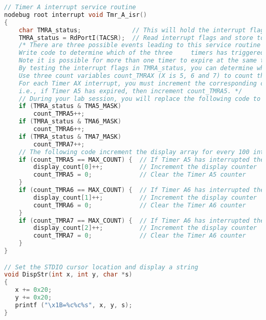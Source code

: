\begin{lstlisting}[frame=single,language=C]
// Timer A interrupt service routine
nodebug root interrupt void Tmr_A_isr()
{
    char TMRA_status;              // This will hold the interrupt flags
    TMRA_status = RdPortI(TACSR);  // Read interrupt flags and store to TMRA_status
    /* There are three possible events leading to this service routine being called
    Write code to determine which of the three     timers has triggered the interrupt.
    Note it is possible for more than one timer to expire at the same time, thus your code must service all triggers.
    By testing the interrupt flags in TMRA_status, you can determine which counters have expired.
    Use three count variables count_TMRAX (X is 5, 6 and 7) to count the number of interrupts.
    For each Timer AX interrupt, you must increment the corresponding count variable.
    i.e., if Timer A5 has expired, then increment count_TMRA5. */
    // During your lab session, you will replace the following code to perform as specified above
    if (TMRA_status & TMA5_MASK)
    	count_TMRA5++;
    if (TMRA_status & TMA6_MASK)
    	count_TMRA6++;
    if (TMRA_status & TMA7_MASK)
    	count_TMRA7++;
    // The following code increment the display array for every 100 interrupts for a respective timer and resets the count variable
    if (count_TMRA5 == MAX_COUNT) {  // If Timer A5 has interrupted the CPU 100 times
        display_count[0]++;          // Increment the display counter
        count_TMRA5 = 0;             // Clear the Timer A5 counter
    }
    if (count_TMRA6 == MAX_COUNT) {  // If Timer A6 has interrupted the CPU 100 times
        display_count[1]++;          // Increment the display counter
        count_TMRA6 = 0;             // Clear the Timer A6 counter
    }
    if (count_TMRA7 == MAX_COUNT) {  // If Timer A6 has interrupted the CPU 100 times
        display_count[2]++;          // Increment the display counter
        count_TMRA7 = 0;             // Clear the Timer A6 counter
    }
}

// Set the STDIO cursor location and display a string
void DispStr(int x, int y, char *s)
{
   x += 0x20;
   y += 0x20;
   printf ("\x1B=%c%c%s", x, y, s);
}
\end{lstlisting}